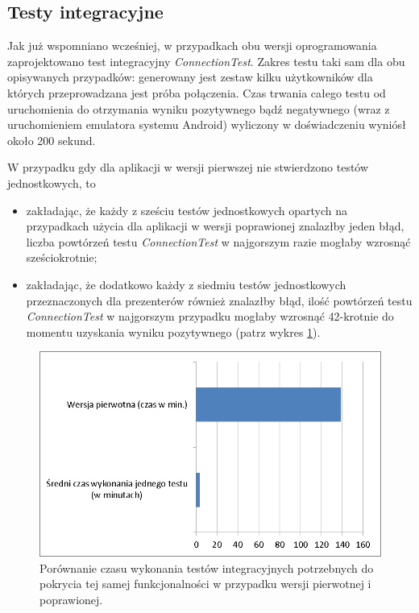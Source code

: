 \subsection{Testy integracyjne}
Jak już wspomniano wcześniej, w przypadkach obu wersji oprogramowania zaprojektowano test integracyjny \textit{ConnectionTest}. Zakres testu taki sam dla obu opisywanych przypadków: generowany jest zestaw kilku użytkowników dla których przeprowadzana jest próba połączenia. Czas trwania całego testu od uruchomienia do otrzymania wyniku pozytywnego bądź negatywnego (wraz z uruchomieniem emulatora systemu Android) wyliczony w doświadczeniu wyniósł około 200 sekund. 

W przypadku gdy dla aplikacji w wersji pierwszej nie stwierdzono testów jednostkowych, to
\begin{itemize}
\item
zakładając, że każdy z sześciu testów jednostkowych opartych na przypadkach użycia dla aplikacji w wersji poprawionej znalazłby jeden błąd, liczba powtórzeń testu \textit{ConnectionTest} w najgorszym razie mogłaby wzrosnąć sześciokrotnie;
\item
zakładając, że dodatkowo każdy z siedmiu testów jednostkowych przeznaczonych dla prezenterów również znalazłby błąd, ilość powtórzeń testu \textit{ConnectionTest} w najgorszym przypadku mogłaby wzrosnąć 42-krotnie do momentu uzyskania wyniku pozytywnego (patrz wykres \ref{fig:app_int_czas}).
\end{itemize}
\begin{figure}[!htb]
    \centering
    \includegraphics[width=12cm]{imgs/ch6_app_int_czas.png}
    \caption
{Porównanie czasu wykonania testów integracyjnych potrzebnych do pokrycia tej samej funkcjonalności w przypadku wersji pierwotnej i poprawionej. }
    \label{fig:app_int_czas}
\end{figure} 


